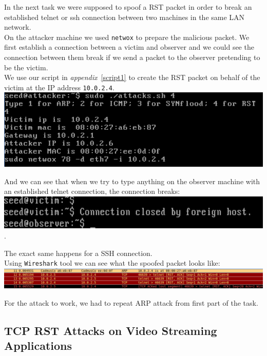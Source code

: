 \documentclass[12pt, a4paper, pdflatex]{article}
\begin{document}
In the next task we were supposed to spoof a RST packet in order to break an established telnet or ssh connection between two machines in the same LAN network.\\

On the attacker machine we used \texttt{netwox} to prepare the malicious packet. We first establish a connection between a victim and observer and we could see the connection between them break if we send a packet to the observer pretending to be the victim.\\

We use our script in \emph{appendix}~\ref{script1} to create the RST packet on behalf of the victim at the IP address \texttt{10.0.2.4}.\\

\includegraphics[width=.95\textwidth]{gfx/rst-attack.png}

And we can see that when we try to type anything on the observer machine with an established telnet connection, the connection breaks:\\

\includegraphics[width=.95\textwidth]{gfx/rst-reset.png}.

The exact same happens for a SSH connection.\\

Using \texttt{Wireshark} tool we can see what the spoofed packet looks like:\\

\includegraphics[width=.95\textwidth]{gfx/rst-spoofed.png}

For the attack to work, we had to repeat ARP attack from first part of the task.

\subsection{TCP RST Attacks on Video Streaming Applications}
\end{document}
